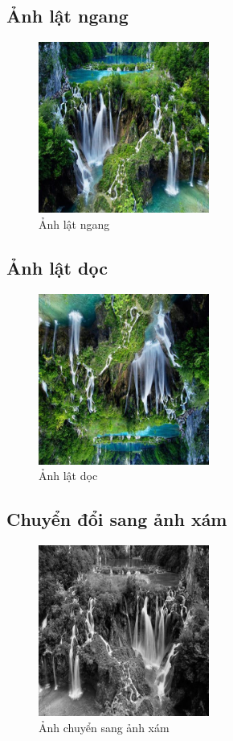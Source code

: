 \subsection{Ảnh lật ngang}
\begin{figure}[H]
	\centering
	\includegraphics[width=0.5\textwidth]{images/res/512_flip_horizontal.png}
	\caption{Ảnh lật ngang}
	\label{fig:flip_horizontal}
\end{figure}

\subsection{Ảnh lật dọc}
\begin{figure}[H]
	\centering
	\includegraphics[width=0.5\textwidth]{images/res/512_flip_vertical.png}
	\caption{Ảnh lật dọc}
	\label{fig:flip_vertical}
\end{figure}

\subsection{Chuyển đổi sang ảnh xám}
\begin{figure}[H]
	\centering
	\includegraphics[width=0.5\textwidth]{images/res/512_grayscale.png}
	\caption{Ảnh chuyển sang ảnh xám}
	\label{fig:gray}
\end{figure}

